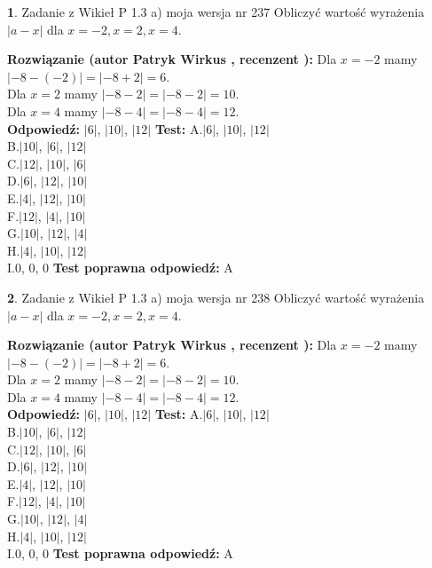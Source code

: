 \documentclass[12pt, a4paper]{article}
\theoremstyle{definition} %
\newtheorem{zad}{}
\newcommand{\zadStart}[1]{\begin{zad}#1\newline}
\newcommand{\zadStop}{\end{zad}}
\newcommand{\rozwStart}[2]{\noindent \textbf{Rozwiązanie (autor #1 , recenzent #2): }\newline}
\newcommand{\rozwStop}{\newline}
\newcommand{\odpStart}{\noindent \textbf{Odpowiedź:}\newline}
\newcommand{\odpStop}{\newline}
\newcommand{\testStart}{\noindent \textbf{Test:}\newline}
\newcommand{\testStop}{\newline}
\newcommand{\kluczStart}{\noindent \textbf{Test poprawna odpowiedź:}\newline}
\newcommand{\kluczStop}{\newline}
\begin{document}
\zadStart{Zadanie z Wikieł P 1.3 a) moja wersja nr 237}
Obliczyć wartość wyrażenia $|a - x|$ dla $x=-2,x=2,x=4$.
\zadStop
\rozwStart{Patryk Wirkus}{}
Dla $x = -2$ mamy $|-8 - (-2)| = |-8 + 2| = 6$.\\
Dla $x = 2$ mamy $|-8 - 2| = |-8 - 2| = 10$.\\
Dla $x = 4$ mamy $|-8 - 4| = |-8 - 4| = 12$.\\
\rozwStop
\odpStart
$|6|$, $|10|$, $|12|$
\odpStop
\testStart
A.$|6|$, $|10|$, $|12|$\\
B.$|10|$, $|6|$, $|12|$\\
C.$|12|$, $|10|$, $|6|$\\
D.$|6|$, $|12|$, $|10|$\\
E.$|4|$, $|12|$, $|10|$\\
F.$|12|$, $|4|$, $|10|$\\
G.$|10|$, $|12|$, $|4|$\\
H.$|4|$, $|10|$, $|12|$\\
I.$0$, $0$, $0$
\testStop
\kluczStart
A
\kluczStop



\zadStart{Zadanie z Wikieł P 1.3 a) moja wersja nr 238}
Obliczyć wartość wyrażenia $|a - x|$ dla $x=-2,x=2,x=4$.
\zadStop
\rozwStart{Patryk Wirkus}{}
Dla $x = -2$ mamy $|-8 - (-2)| = |-8 + 2| = 6$.\\
Dla $x = 2$ mamy $|-8 - 2| = |-8 - 2| = 10$.\\
Dla $x = 4$ mamy $|-8 - 4| = |-8 - 4| = 12$.\\
\rozwStop
\odpStart
$|6|$, $|10|$, $|12|$
\odpStop
\testStart
A.$|6|$, $|10|$, $|12|$\\
B.$|10|$, $|6|$, $|12|$\\
C.$|12|$, $|10|$, $|6|$\\
D.$|6|$, $|12|$, $|10|$\\
E.$|4|$, $|12|$, $|10|$\\
F.$|12|$, $|4|$, $|10|$\\
G.$|10|$, $|12|$, $|4|$\\
H.$|4|$, $|10|$, $|12|$\\
I.$0$, $0$, $0$
\testStop
\kluczStart
A
\kluczStop
\end{document}
